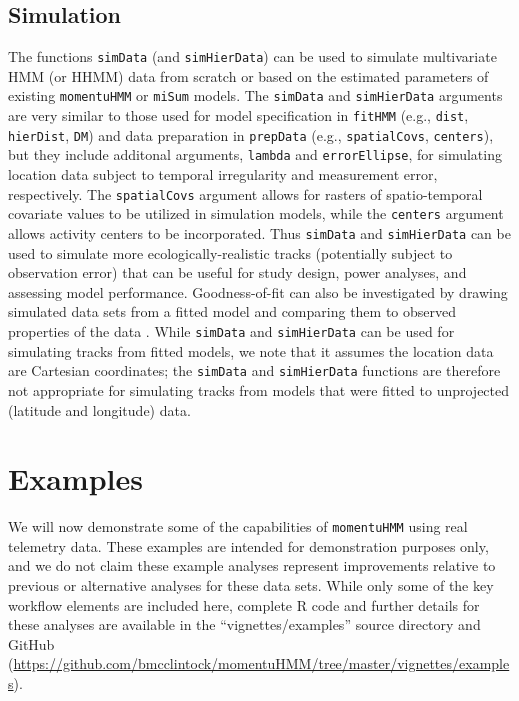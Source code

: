 \documentclass[12pt]{article}\usepackage[]{graphicx}\usepackage[]{color}
\begin{document}
\subsection{Simulation}
The functions \verb|simData| (and \verb|simHierData|) can be used to simulate multivariate HMM (or HHMM) data from scratch or based on the estimated parameters of existing \verb|momentuHMM| or \verb|miSum| models.  The \verb|simData| and \verb|simHierData| arguments are very similar to those used for model specification in \verb|fitHMM| (e.g., \verb|dist|, \verb|hierDist|, \verb|DM|) and data preparation in \verb|prepData| (e.g., \verb|spatialCovs|, \verb|centers|), but they include additonal arguments, \verb|lambda| and \verb|errorEllipse|, for simulating location data subject to temporal irregularity and measurement error, respectively. The \verb|spatialCovs| argument allows for rasters of spatio-temporal covariate values to be utilized in simulation models, while the \verb|centers| argument allows activity centers to be incorporated. Thus \verb|simData| and \verb|simHierData| can be used to simulate more ecologically-realistic tracks (potentially subject to observation error) that can be useful for study design, power analyses, and assessing model performance. Goodness-of-fit can also be investigated by drawing simulated data sets from a fitted model and comparing them to observed properties of the data \citep{MoralesEtAl2004}. While \verb|simData| and \verb|simHierData| can be used for simulating tracks from fitted models, we note that it assumes the location data are Cartesian coordinates; the \verb|simData| and \verb|simHierData| functions are therefore not appropriate for simulating tracks from models that were fitted to unprojected (latitude and longitude) data.
  
\section{Examples}
\label{sec:example}
We will now demonstrate some of the capabilities of \verb|momentuHMM| using real telemetry data. These examples are intended for demonstration purposes only, and we do not claim these example analyses represent improvements relative to previous or alternative analyses for these data sets. While only some of the key workflow elements are included here, complete R code and further details for these analyses are available in the ``vignettes/examples'' source directory and GitHub (\url{https://github.com/bmcclintock/momentuHMM/tree/master/vignettes/examples}).
\end{document}
